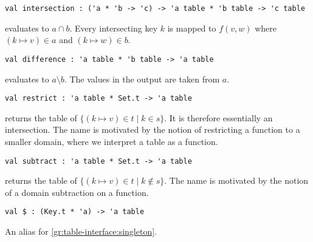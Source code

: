 \begin{gram}[intersection]
\begin{verbatim}
val intersection : ('a * 'b -> 'c) -> 'a table * 'b table -> 'c table
\end{verbatim}
 evaluates to $a \cap b$. Every intersecting key
$k$ is mapped to $f(v,w)$ where $(k \mapsto v) \in a$ and $(k \mapsto w) \in b$.
\end{gram}

\begin{gram}[difference]
\begin{verbatim}
val difference : 'a table * 'b table -> 'a table
\end{verbatim}
 evaluates to $a \setminus b$. The values in the output
are taken from $a$.
\end{gram}

\begin{gram}[restrict]
\begin{verbatim}
val restrict : 'a table * Set.t -> 'a table
\end{verbatim}
 returns the table of $\{(k \mapsto v) \in t \mathbin| k \in s\}$.
It is therefore essentially an intersection. The name is motivated by the
notion of restricting a function to a smaller domain, where we interpret a table
as a function.
\end{gram}

\begin{gram}[subtract]
\begin{verbatim}
val subtract : 'a table * Set.t -> 'a table
\end{verbatim}
 returns the table of
$\{(k \mapsto v) \in t \mathbin| k \not\in s\}$.
The name is motivated by the notion of a domain subtraction on a function.
\end{gram}

\begin{gram}[\$]
\begin{verbatim}
val $ : (Key.t * 'a) -> 'a table
\end{verbatim}
An alias for \ref{gr:table-interface:singleton}.
\end{gram}


